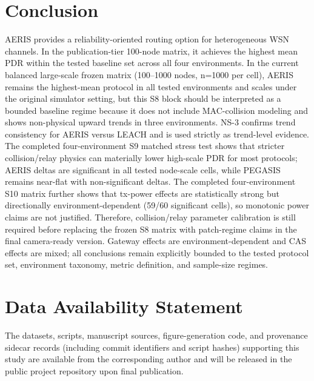 \documentclass[sensors,article,submit,moreauthors,pdftex]{Definitions/mdpi}
\begin{document}
\section{Conclusion}
AERIS provides a reliability-oriented routing option for heterogeneous WSN channels. In the publication-tier 100-node matrix, it achieves the highest mean PDR within the tested baseline set across all four environments. In the current balanced large-scale frozen matrix (100--1000 nodes, n=1000 per cell), AERIS remains the highest-mean protocol in all tested environments and scales under the original simulator setting, but this S8 block should be interpreted as a bounded baseline regime because it does not include MAC-collision modeling and shows non-physical upward trends in three environments. NS-3 confirms trend consistency for AERIS versus LEACH and is used strictly as trend-level evidence. The completed four-environment S9 matched stress test shows that stricter collision/relay physics can materially lower high-scale PDR for most protocols; AERIS deltas are significant in all tested node-scale cells, while PEGASIS remains near-flat with non-significant deltas. The completed four-environment S10 matrix further shows that tx-power effects are statistically strong but directionally environment-dependent (59/60 significant cells), so monotonic power claims are not justified. Therefore, collision/relay parameter calibration is still required before replacing the frozen S8 matrix with patch-regime claims in the final camera-ready version. Gateway effects are environment-dependent and CAS effects are mixed; all conclusions remain explicitly bounded to the tested protocol set, environment taxonomy, metric definition, and sample-size regimes.

\section*{Data Availability Statement}
The datasets, scripts, manuscript sources, figure-generation code, and provenance sidecar records (including commit identifiers and script hashes) supporting this study are available from the corresponding author and will be released in the public project repository upon final publication.


\end{document}
